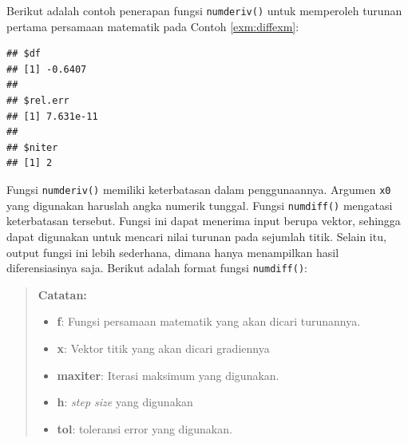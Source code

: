 \documentclass[]{book}
\newenvironment{Shaded}{\begin{snugshade}}{\end{snugshade}}
\newcommand{\ControlFlowTok}[1]{\textcolor[rgb]{0.13,0.29,0.53}{\textbf{#1}}}
\newcommand{\DataTypeTok}[1]{\textcolor[rgb]{0.13,0.29,0.53}{#1}}
\newcommand{\DecValTok}[1]{\textcolor[rgb]{0.00,0.00,0.81}{#1}}
\newcommand{\KeywordTok}[1]{\textcolor[rgb]{0.13,0.29,0.53}{\textbf{#1}}}
\newcommand{\NormalTok}[1]{#1}
\newcommand{\OperatorTok}[1]{\textcolor[rgb]{0.81,0.36,0.00}{\textbf{#1}}}
\providecommand{\tightlist}{%
  \setlength{\itemsep}{0pt}\setlength{\parskip}{0pt}}
\theoremstyle{definition}
\theoremstyle{definition}
\theoremstyle{definition}
\theoremstyle{remark}
\begin{document}
Berikut adalah contoh penerapan fungsi \texttt{numderiv()} untuk memperoleh turunan pertama persamaan matematik pada Contoh \ref{exm:diffexm}:

\begin{Shaded}
\end{Shaded}

\begin{verbatim}
## $df
## [1] -0.6407
## 
## $rel.err
## [1] 7.631e-11
## 
## $niter
## [1] 2
\end{verbatim}

Fungsi \texttt{numderiv()} memiliki keterbatasan dalam penggunaannya. Argumen \texttt{x0} yang digunakan haruslah angka numerik tunggal. Fungsi \texttt{numdiff()} mengatasi keterbatasan tersebut. Fungsi ini dapat menerima input berupa vektor, sehingga dapat digunakan untuk mencari nilai turunan pada sejumlah titik. Selain itu, output fungsi ini lebih sederhana, dimana hanya menampilkan hasil diferensiasinya saja. Berikut adalah format fungsi \texttt{numdiff()}:

\begin{Shaded}
\end{Shaded}

\begin{quote}
\textbf{Catatan:}

\begin{itemize}
\tightlist
\item
  \textbf{f}: Fungsi persamaan matematik yang akan dicari turunannya.
\item
  \textbf{x}: Vektor titik yang akan dicari gradiennya
\item
  \textbf{maxiter}: Iterasi maksimum yang digunakan.
\item
  \textbf{h}: \emph{step size} yang digunakan
\item
  \textbf{tol}: toleransi error yang digunakan.
\end{itemize}
\end{quote}
\end{document}
